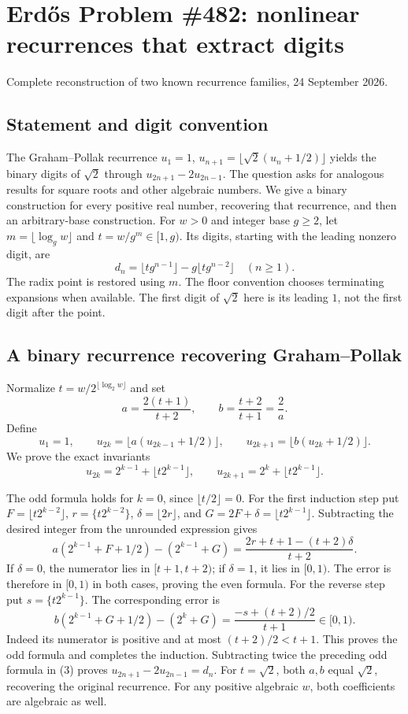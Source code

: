 \section{Erd\H{o}s Problem \#482: nonlinear recurrences that extract digits}
\noindent Complete reconstruction of two known recurrence families, 24 September 2026.

\subsection*{Statement and digit convention}
The Graham--Pollak recurrence $u_1=1$, $u_{n+1}=\lfloor\sqrt2(u_n+1/2)\rfloor$ yields the binary digits of $\sqrt2$ through $u_{2n+1}-2u_{2n-1}$. The question asks for analogous results for square roots and other algebraic numbers. We give a binary construction for every positive real number, recovering that recurrence, and then an arbitrary-base construction.
For $w>0$ and integer base $g\ge2$, let $m=\lfloor\log_g w\rfloor$ and $t=w/g^m\in[1,g)$. Its digits, starting with the leading nonzero digit, are
\[d_n=\lfloor tg^{n-1}\rfloor-g\lfloor tg^{n-2}\rfloor\quad(n\ge1).\tag{1}\]
The radix point is restored using $m$. The floor convention chooses terminating expansions when available. The first digit of $\sqrt2$ here is its leading $1$, not the first digit after the point.

\subsection*{A binary recurrence recovering Graham--Pollak}
Normalize $t=w/2^{\lfloor\log_2w\rfloor}$ and set
\[a=\frac{2(t+1)}{t+2},\qquad b=\frac{t+2}{t+1}=\frac2a.
\]
Define
\[u_1=1,\qquad u_{2k}=\lfloor a(u_{2k-1}+1/2)\rfloor,
\qquad u_{2k+1}=\lfloor b(u_{2k}+1/2)\rfloor.\tag{2}\]
We prove the exact invariants
\[u_{2k}=2^{k-1}+\lfloor t2^{k-1}\rfloor,\qquad
u_{2k+1}=2^k+\lfloor t2^{k-1}\rfloor.\tag{3}\]

The odd formula holds for $k=0$, since $\lfloor t/2\rfloor=0$. For the first induction step put $F=\lfloor t2^{k-2}\rfloor$, $r=\{t2^{k-2}\}$, $\delta=\lfloor2r\rfloor$, and $G=2F+\delta=\lfloor t2^{k-1}\rfloor$. Subtracting the desired integer from the unrounded expression gives
\[a(2^{k-1}+F+1/2)-(2^{k-1}+G)
=\frac{2r+t+1-(t+2)\delta}{t+2}.
\]
If $\delta=0$, the numerator lies in $[t+1,t+2)$; if $\delta=1$, it lies in $[0,1)$. The error is therefore in $[0,1)$ in both cases, proving the even formula. For the reverse step put $s=\{t2^{k-1}\}$. The corresponding error is
\[b(2^{k-1}+G+1/2)-(2^k+G)=\frac{-s+(t+2)/2}{t+1}\in[0,1).
\]
Indeed its numerator is positive and at most $(t+2)/2<t+1$. This proves the odd formula and completes the induction. Subtracting twice the preceding odd formula in (3) proves $u_{2n+1}-2u_{2n-1}=d_n$.
For $t=\sqrt2$, both $a,b$ equal $\sqrt2$, recovering the original recurrence. For any positive algebraic $w$, both coefficients are algebraic as well.

